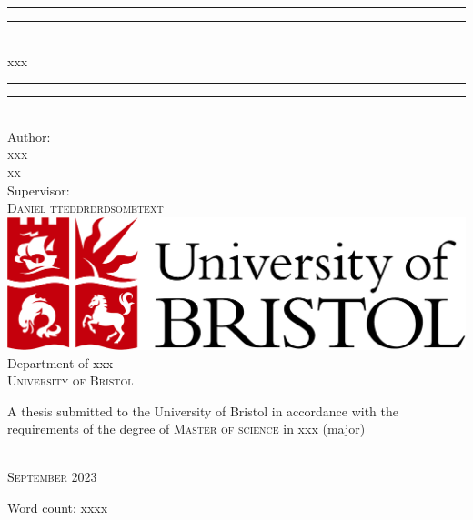\begin{titlepage}

\vspace*{13mm}

\begin{center}
\rule[0.5ex]{\linewidth}{2pt}\vspace*{-\baselineskip}\vspace*{3.2pt}
\rule[0.5ex]{\linewidth}{1pt}\\[\baselineskip]
{\LARGE xxx}\\[4mm]
\rule[0.5ex]{\linewidth}{1pt}\vspace*{-\baselineskip}\vspace{3.2pt}
\rule[0.5ex]{\linewidth}{2pt}\\

\vspace{6.5mm}
{\large Author: \\
\textsc{xxx}\\
\textsc{xx}}\\

\vspace{6.5mm}
{\large Supervisor: \\
\textsc{Daniel  tteddrdrdsometext }}\\

\vspace{11mm}
\includegraphics[scale=0.2]{logos/bristollogo_colour}\\
\vspace{6mm}
{\large Department of xxx\\
\vspace{6mm}
\textsc{University of Bristol}}\\
\vspace{6mm}
\begin{minipage}{10cm}
A thesis submitted to the University of Bristol in accordance with the requirements of the degree of \textsc{Master of science} in xxx (major)
\end{minipage}\\
\vspace{11mm}
{\large\textsc{September 2023}}
\vspace{11mm}
\end{center}

\begin{flushright}
{\small Word count: xxxx}
\end{flushright}

\end{titlepage}